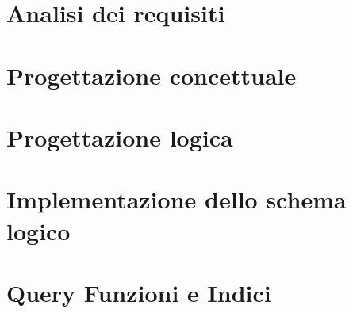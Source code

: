 \documentclass[a4paper,11pt]{report}
\begin{document}
    \tableofcontents

    
    
    \chapter{Analisi dei requisiti}
        

    \chapter{Progettazione concettuale}
        

    \chapter{Progettazione logica}
        

    \chapter{Implementazione dello schema logico}
        

    \chapter{Query Funzioni e Indici}
        
\end{document}
